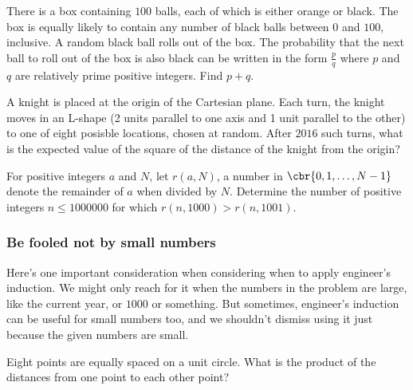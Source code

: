 \documentclass[11pt,paper=letter]{scrartcl}
\begin{document}
\begin{mdframed}[style=exmdbox]

\begin{problem}
  There is a box containing $100$ balls, each of which is either orange or black. The box is equally likely to contain any number of black balls between $0$ and $100$, inclusive. A random black ball rolls out of the box. The probability that the next ball to roll out of the box is also black can be written in the form $\frac pq$ where $p$ and $q$ are relatively prime positive integers. Find $p + q$.
\end{problem}

\begin{problem}
  A knight is placed at the origin of the Cartesian plane. Each turn, the knight moves in an L-shape (2 units parallel to one axis and 1 unit parallel to the other) to one of eight posisble locations, chosen at random. After $2016$ such turns, what is the expected value of the square of the distance of the knight from the origin?
\end{problem}

\begin{problem}
  For positive integers $a$ and $N$, let $r(a, N)$, a number in $\cbr{0, 1, \ldots, N-1}$ denote the remainder of $a$ when divided by $N$. Determine the number of positive integers $n \leq 1000000$ for which $r(n, 1000) > r(n, 1001)$. \hint{\ref{h:1}}
\end{problem}

\end{mdframed}

\subsubsection{Be fooled not by small numbers}

Here's one important consideration when considering when to apply engineer's induction. We might only reach for it when the numbers in the problem are large, like the current year, or $1000$ or something. But sometimes, engineer's induction can be useful for small numbers too, and we shouldn't dismiss using it just because the given numbers are small. 

\begin{exboxed}
Eight points are equally spaced on a unit circle. What is the product of the distances from one point to each other point?
\end{exboxed}
\end{document}

